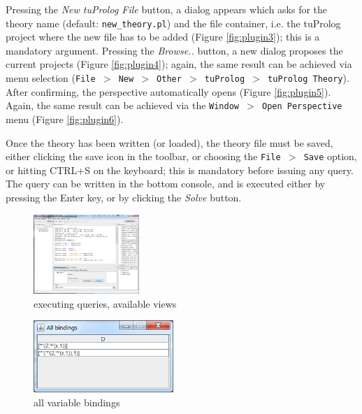 Pressing the \textit{New tuProlog File} button, a dialog appears which asks for the theory name (default: \texttt{new\_theory.pl}) and the file container, i.e. the tuProlog project where the new file has to be added (Figure \ref{fig:plugin3}); this is a mandatory argument. Pressing the \textit{Browse..} button, a new dialog proposes the current \tuprolog{} projects (Figure \ref{fig:plugin4}); again, the same result can be achieved via menu selection  (\texttt{File $>$ New $>$ Other $>$ tuProlog $>$ tuProlog Theory}). After confirming, the \tuprolog{} perspective automatically opens (Figure \ref{fig:plugin5}). Again, the same result can be achieved via the \texttt{Window $>$ Open Perspective} menu (Figure \ref{fig:plugin6}).

Once the theory has been written (or loaded), the theory file must be saved, either clicking the save icon in the toolbar, or choosing the \texttt{File $>$ Save} option, or hitting CTRL+S on the keyboard; this is mandatory before issuing any query.
The query can be written in the bottom console, and is executed either by pressing the Enter key, or by clicking the \textit{Solve} button.


\begin{figure}
\centering
  \includegraphics[width=4cm]{images/plugin7.png}
  \caption{executing queries, available views}\label{fig:plugin7}
\end{figure}

\begin{figure}
\centering
  \includegraphics[width=200px]{images/plugin8.png}
  \caption{all variable bindings}\label{fig:plugin8}
\end{figure}

